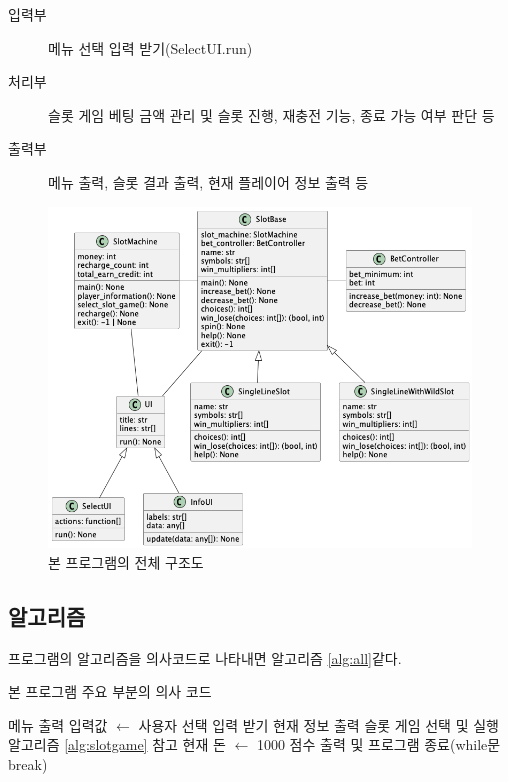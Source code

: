 \documentclass{article}
\begin{document}
\begin{description}
  \item[입력부] 메뉴 선택 입력 받기(SelectUI.run)
  \item[처리부] 슬롯 게임 베팅 금액 관리 및 슬롯 진행, 재충전 기능, 종료 가능 여부 판단 등
  \item[출력부] 메뉴 출력, 슬롯 결과 출력, 현재 플레이어 정보 출력 등
\end{description}

\begin{figure}
  \includegraphics[width=\textwidth]{assets/structure_chart.png}
  \caption{본 프로그램의 전체 구조도}
  \label{fig:structurechart}
\end{figure}

\subsection{알고리즘}
프로그램의 알고리즘을 의사코드로 나타내면 알고리즘 \ref{alg:all}\과 같다.

\begin{algorithm}
  \caption{본 프로그램 주요 부분의 의사 코드} \label{alg:all}
  \begin{algorithmic}
    \While {}
      \State 메뉴 출력
      \State 입력값 $\gets$ 사용자 선택 입력 받기
        \State 현재 정보 출력
        \State 슬롯 게임 선택 및 실행
        \Comment 알고리즘 \ref{alg:slotgame} 참고
          \State 현재 돈 $\gets$ 1000
        \EndIf
          \State 점수 출력 및 프로그램 종료(while문 break)
        \EndIf
      \EndIf
    \EndWhile
  \end{algorithmic}
\end{algorithm}
\end{document}
